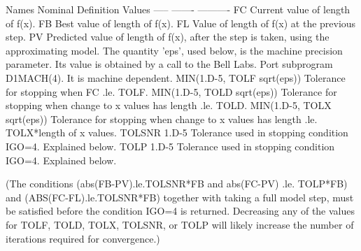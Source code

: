 \documentclass[11pt,twoside,nolof]{starlink}
\begin{document}
\begin{terminalv}
       Names    Nominal         Definition
                Values
       -----    -------         ----------
       FC                       Current value of length of f(x).
       FB                       Best value of length of f(x).
       FL                       Value of length of f(x) at the
                                previous step.
       PV                       Predicted value of length of f(x),
                                after the step is taken, using the
                                approximating model.
  The  quantity  'eps',  used  below,  is  the  machine  precision
  parameter.   Its  value  is obtained by a call to the Bell Labs.
  Port subprogram D1MACH(4).  It is machine dependent.
                MIN(1.D-5,
       TOLF     sqrt(eps))      Tolerance for stopping when
                                FC .le. TOLF.
                MIN(1.D-5,
       TOLD     sqrt(eps))      Tolerance for stopping when
                                change to x values has length
                                .le. TOLD.
                MIN(1.D-5,
       TOLX     sqrt(eps))      Tolerance for stopping when
                                change to x values has length
                                .le. TOLX*length of x values.
       TOLSNR    1.D-5          Tolerance used in stopping
                                condition IGO=4.  Explained below.
       TOLP      1.D-5          Tolerance used in stopping
                                condition IGO=4.  Explained below.

  (The  conditions  (abs(FB-PV).le.TOLSNR*FB  and  abs(FC-PV) .le.
  TOLP*FB)   and  (ABS(FC-FL).le.TOLSNR*FB) together with  taking
  a  full  model  step, must be satisfied before the condition  IGO=4
  is returned.  Decreasing any of the values for  TOLF,  TOLD,  TOLX,
  TOLSNR,  or  TOLP  will likely increase the number of iterations
  required for convergence.)


\end{terminalv}
\end{document}
